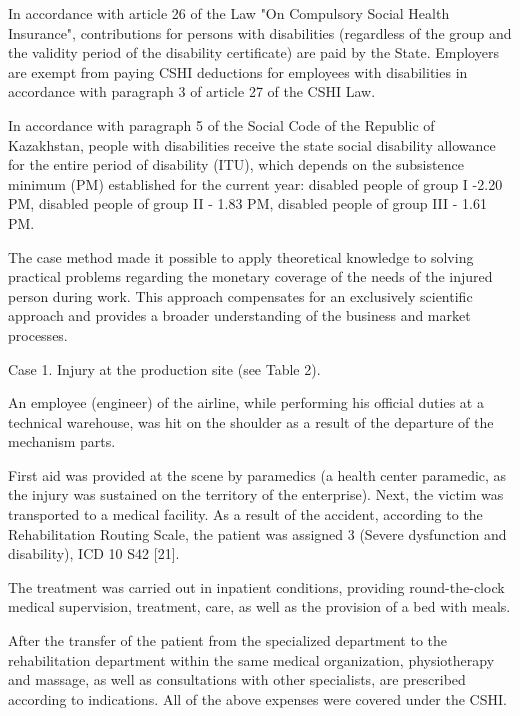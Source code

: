 \begin{multicols}{2}
In accordance with article 26 of the Law "On Compulsory Social Health
Insurance", contributions for persons with disabilities (regardless of
the group and the validity period of the disability certificate) are
paid by the State. Employers are exempt from paying CSHI deductions for
employees with disabilities in accordance with paragraph 3 of article 27
of the CSHI Law.

In accordance with paragraph 5 of the Social Code of the Republic of
Kazakhstan, people with disabilities receive the state social disability
allowance for the entire period of disability (ITU), which depends on
the subsistence minimum (PM) established for the current year: disabled
people of group I -2.20 PM, disabled people of group II - 1.83 PM,
disabled people of group III - 1.61 PM.

The case method made it possible to apply theoretical knowledge to
solving practical problems regarding the monetary coverage of the needs
of the injured person during work. This approach compensates for an
exclusively scientific approach and provides a broader understanding of
the business and market processes.

Case 1. Injury at the production site (see Table 2).

An employee (engineer) of the airline, while performing his official
duties at a technical warehouse, was hit on the shoulder as a result of
the departure of the mechanism parts.

First aid was provided at the scene by paramedics (a health center
paramedic, as the injury was sustained on the territory of the
enterprise). Next, the victim was transported to a medical facility. As
a result of the accident, according to the Rehabilitation Routing Scale,
the patient was assigned 3 (Severe dysfunction and disability), ICD 10
S42 {[}21{]}.

The treatment was carried out in inpatient conditions, providing
round-the-clock medical supervision, treatment, care, as well as the
provision of a bed with meals.

After the transfer of the patient from the specialized department to the
rehabilitation department within the same medical organization,
physiotherapy and massage, as well as consultations with other
specialists, are prescribed according to indications. All of the above
expenses were covered under the CSHI.


\end{multicols}
